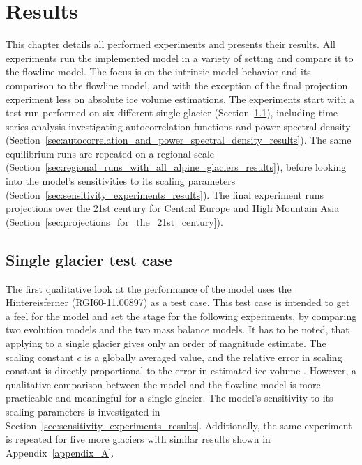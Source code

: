 \chapter{Results}\label{chap:results}
\thispagestyle{plain}

  This chapter details all performed experiments and presents their results. All experiments run the implemented \vas{} model in a variety of setting and compare it to the flowline model. The focus is on the intrinsic model behavior and its comparison to the flowline model, and with the exception of the final projection experiment less on absolute ice volume estimations. The experiments start with a test run performed on six different single glacier (Section~\ref{sec:single_glacier_test_case_results}), including time series analysis investigating autocorrelation functions and power spectral density (Section~\ref{sec:autocorrelation_and_power_spectral_density_results}). The same equilibrium runs are repeated on a regional scale (Section~\ref{sec:regional_runs_with_all_alpine_glaciers_results}), before looking into the model's sensitivities to its scaling parameters (Section~\ref{sec:sensitivity_experiments_results}).
  The final experiment runs projections over the 21st century for Central Europe and High Mountain Asia (Section~\ref{sec:projections_for_the_21st_century}).

  \section{Single glacier test case} %
  \label{sec:single_glacier_test_case_results}

    The first qualitative look at the performance of the \vas{} model uses the Hintereisferner (RGI60-11.00897) as a test case. This test case is intended to get a feel for the model and set the stage for the following experiments, by comparing two evolution models and the two mass balance models. 
    It has to be noted, that applying \vas{} to a single glacier gives only an order of magnitude estimate. The scaling constant $c$ is a globally averaged value, and the relative error in scaling constant is directly proportional to the error in estimated ice volume \citep{Bahr2015}. However, a qualitative comparison between the \vas{} model and the flowline model is more practicable and meaningful for a single glacier. The model's sensitivity to its scaling parameters is investigated in Section~\ref{sec:sensitivity_experiments_results}. Additionally, the same experiment is repeated for five more glaciers with similar results shown in Appendix~\ref{appendix_A}.

